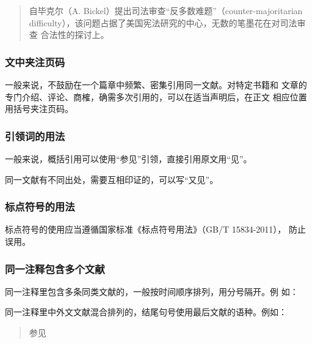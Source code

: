 \documentclass{article}
\begin{document}
\begin{quotation}
自毕克尔（A. Bickel）提出司法审查“反多数难题”（counter-majoritarian
difficulty），该问题占据了美国宪法研究的中心，无数的笔墨花在对司法审查
合法性的探讨上。
\end{quotation}

\subsubsection{文中夹注页码}

一般来说，不鼓励在一个篇章中频繁、密集引用同一文献。对特定书籍和
文章的专门介绍、评论、商榷，确需多次引用的，可以在适当声明后，在正文
相应位置用括号夹注页码。

\subsubsection{引领词的用法}

一般来说，概括引用可以使用“参见”引领，直接引用原文用“见”。

同一文献有不同出处，需要互相印证的，可以写“又见”。


\subsubsection{标点符号的用法}

标点符号的使用应当遵循国家标准《标点符号用法》（GB/T 15834-2011），
防止误用。

\subsubsection{同一注释包含多个文献}
同一注释里包含多条同类文献的，一般按时间顺序排列，用分号隔开。例
如：

\begin{quotation}
\end{quotation}

同一注释里中外文文献混合排列的，结尾句号使用最后文献的语种。例如：
\begin{quotation}
参见
\end{quotation}
\end{document}
